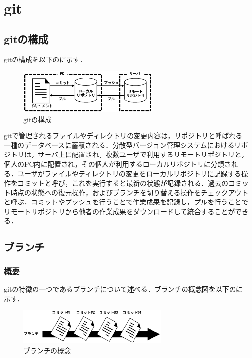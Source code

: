 \documentclass[a4j,9pt,twocolumn]{jsarticle}
\begin{document}
\section{git}
\subsection{gitの構成}
gitの構成を以下のに示す．

\begin{figure}[h]
\centering
\includegraphics[width=70mm]{img/git.eps}
\caption{gitの構成}
\label{git}
\end{figure}

gitで管理されるファイルやディレクトリの変更内容は，リポジトリと呼ばれる一種のデータベースに蓄積される．分散型バージョン管理システムにおけるリポジトリは，サーバ上に配置され，複数ユーザで利用するリモートリポジトリと，個人のPC内に配置され，その個人が利用するローカルリポジトリに分類される．ユーザがファイルやディレクトリの変更をローカルリポジトリに記録する操作をコミットと呼び，これを実行すると最新の状態が記録される．過去のコミット時点の状態への復元操作，およびブランチを切り替える操作をチェックアウトと呼ぶ．コミットやプッシュを行うことで作業成果を記録し，プルを行うことでリモートリポジトリから他者の作業成果をダウンロードして統合することができる．

\subsection{ブランチ}
\subsubsection{概要}
gitの特徴の一つであるブランチについて述べる．ブランチの概念図を以下のに示す．

\begin{figure}[h]
\centering
\includegraphics[width=75mm]{img/branch1.eps}
\caption{ブランチの概念}
\label{branch}
\end{figure}
\end{document}
